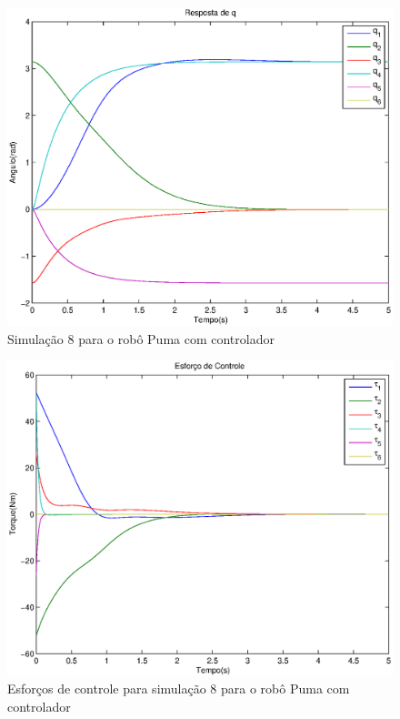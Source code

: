 \documentclass{article}
\begin{document}
\begin{figure}[H]
	\centering
	\includegraphics[width=0.8\linewidth]{../sim2cl}
	\caption{Simulação 8 para o robô Puma com controlador}
	\label{fig:pumasim8}
\end{figure}

\begin{figure}[H]
	\centering
	\includegraphics[width=0.8\linewidth]{../sim2clu}
	\caption{Esforços de controle para simulação 8 para o robô Puma com controlador}
	\label{fig:pumasim8clu}
\end{figure}
\end{document}
